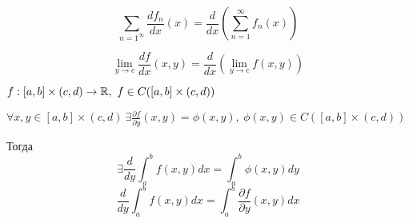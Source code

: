     \begin{corollary}
        \[
            \sum_{n=1^\infty} \frac{df_n}{dx}(x) = \frac{d}{dx}(\sum_{n=1}^{\infty} f_n(x))    
        \]
    \end{corollary}

    \begin{corollary}
        \[
            \lim_{y \rightarrow c} \frac{df}{dx}(x, y) = \frac{d}{dx}(\lim_{y \rightarrow c} f(x, y))
        \]
    \end{corollary}

    \begin{theorem}
        $f : [a, b] \times (c, d) \rightarrow \R, \ f \in C([a, b] \times (c, d))$
        \par $\forall x, y \in [a, b] \times (c,d ) \ \exists \frac{\partial f}{\partial y}(x,y) = \phi(x, y), \ \phi(x, y) \in C([a, b] \times (c, d))$
        \par Тогда
        \[
            \exists \frac{d}{dy} \int_a^b f(x,y) dx = \int_a^b \phi(x, y)dy
        \]
        \[
            \frac{d}{dy} \int_a^b f(x, y)dx  = \int_a^b \frac{\partial f}{\partial y}(x, y)dx   
        \]
    \end{theorem}

